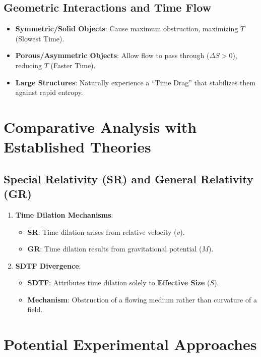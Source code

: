 \documentclass[12pt]{article}
\begin{document}
\subsection{Geometric Interactions and Time Flow}

\begin{itemize}
    \item \textbf{Symmetric/Solid Objects}: Cause maximum obstruction, maximizing \( T \) (Slowest Time).
    \item \textbf{Porous/Asymmetric Objects}: Allow flow to pass through (\( \Delta S > 0 \)), reducing \( T \) (Faster Time).
    \item \textbf{Large Structures}: Naturally experience a ``Time Drag'' that stabilizes them against rapid entropy.
\end{itemize}

\section{Comparative Analysis with Established Theories}

\subsection{Special Relativity (SR) and General Relativity (GR)}

\begin{enumerate}
    \item \textbf{Time Dilation Mechanisms}:
    \begin{itemize}
        \item \textbf{SR}: Time dilation arises from relative velocity ($v$).
        \item \textbf{GR}: Time dilation results from gravitational potential ($M$).
    \end{itemize}
    
    \item \textbf{SDTF Divergence}:
    \begin{itemize}
        \item \textbf{SDTF}: Attributes time dilation solely to \textbf{Effective Size} ($S$).
        \item \textbf{Mechanism}: Obstruction of a flowing medium rather than curvature of a field.
    \end{itemize}
\end{enumerate}

\section{Potential Experimental Approaches}
\end{document}
